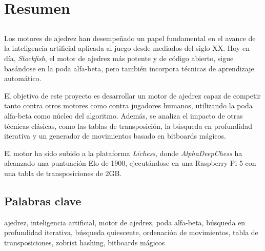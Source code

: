 \chapter*{Resumen}

\section*{\tituloPortadaVal}

Los motores de ajedrez han desempeñado un papel fundamental en el avance de la inteligencia artificial aplicada al juego desde mediados del siglo XX. Hoy en día, \textit{Stockfish}, el motor de ajedrez más potente y de código abierto, sigue basándose en la poda alfa-beta, pero también incorpora técnicas de aprendizaje automático.

\vspace{1em}

El objetivo de este proyecto es desarrollar un motor de ajedrez capaz de competir tanto contra otros motores como contra jugadores humanos, utilizando la poda alfa-beta como núcleo del algoritmo. Además, se analiza el impacto de otras técnicas clásicas, como las tablas de transposición, la búsqueda en profundidad iterativa y un generador de movimientos basado en bitboards mágicos.

\vspace{1em}

El motor ha sido subido a la plataforma \textit{Lichess}, donde \textit{AlphaDeepChess} ha alcanzado una puntuación Elo de 1900, ejecutándose en una Raspberry Pi 5 con una tabla de transposiciones de 2GB.

\section*{Palabras clave}
   
\noindent ajedrez, inteligencia artificial, motor de ajedrez, poda alfa-beta, búsqueda en profundidad iterativa, búsqueda quiescente, ordenación de movimientos, tabla de transposiciones, zobrist hashing, bitboards mágicos

